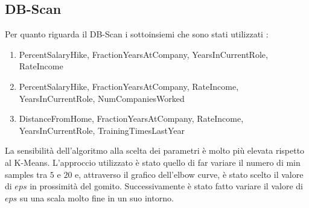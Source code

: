 \documentclass[a4paper,9pt]{article}
\begin{document}
\subsection{DB-Scan}
Per quanto riguarda il DB-Scan i sottoinsiemi che sono stati utilizzati :\\
\begin{enumerate}
\item PercentSalaryHike, FractionYearsAtCompany, YearsInCurrentRole, RateIncome
\item PercentSalaryHike, FractionYearsAtCompany, RateIncome, YearsInCurrentRole, NumCompaniesWorked
\item DistanceFromHome, FractionYearsAtCompany, RateIncome, YearsInCurrentRole, TrainingTimesLastYear
\end{enumerate}

La sensibilità dell'algoritmo alla scelta dei parametri è molto più elevata rispetto al K-Means. L'approccio utilizzato è stato quello di far variare il numero di min samples tra $5$ e $20$ e, attraverso il grafico dell'elbow curve, è stato scelto il valore di $eps$ in prossimità del gomito. Successivamente è stato fatto variare il valore di $eps$ su una scala molto fine in un suo intorno.
\end{document}
